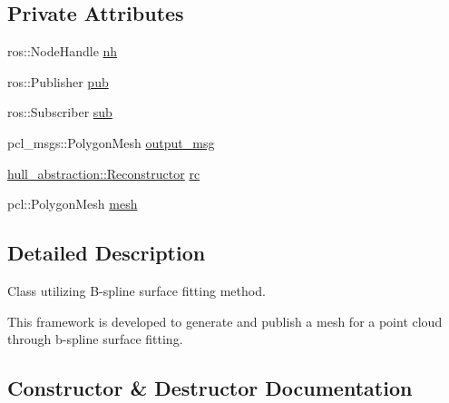 \subsection*{Private Attributes}
\begin{DoxyCompactItemize}
\item 
ros\+::\+Node\+Handle \hyperlink{classbspline__surface__fitting__node_1_1_bspline_surface_fitting_ab3fb2f277d26f9a58e9575257d035251}{nh}
\item 
ros\+::\+Publisher \hyperlink{classbspline__surface__fitting__node_1_1_bspline_surface_fitting_ac1a664418699fc1f06e5da7637530520}{pub}
\item 
ros\+::\+Subscriber \hyperlink{classbspline__surface__fitting__node_1_1_bspline_surface_fitting_a1ca9460f2069655ce0b55683a6622688}{sub}
\item 
pcl\+\_\+msgs\+::\+Polygon\+Mesh \hyperlink{classbspline__surface__fitting__node_1_1_bspline_surface_fitting_a38d7b7bf42448ad65e7501c19ce859a2}{output\+\_\+msg}
\item 
\hyperlink{classhull__abstraction_1_1_reconstructor}{hull\+\_\+abstraction\+::\+Reconstructor} \hyperlink{classbspline__surface__fitting__node_1_1_bspline_surface_fitting_a37fc14202f71f41647bc78ed21a1f691}{rc}
\item 
pcl\+::\+Polygon\+Mesh \hyperlink{classbspline__surface__fitting__node_1_1_bspline_surface_fitting_a3f3f3a25956432185b5927e0b920a53e}{mesh}
\end{DoxyCompactItemize}


\subsection{Detailed Description}
Class utilizing B-\/spline surface fitting method. 

This framework is developed to generate and publish a mesh for a point cloud through b-\/spline surface fitting. 

\subsection{Constructor \& Destructor Documentation}
